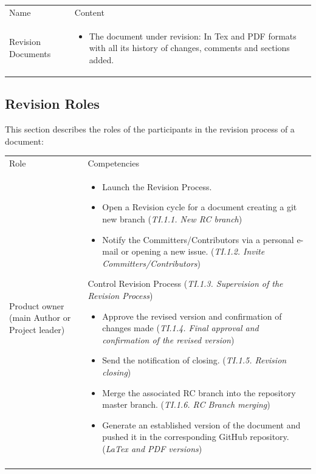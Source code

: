 \documentclass{template/openetcs_article}
\begin{document}
\begin{flushleft}
\begin{tabular}{|m{3cm}|m{11cm}|}
\hline
\rowcolor{myblue}
\multicolumn{2}{|c|}{Structure of the repository} \\\hline
\rowcolor{lightgray}
Name &
Content 
\\\hline
Revision Documents &
\begin{itemize}
\item The document under revision: In Tex and PDF formats with all its history of changes, comments and sections added.
\end{itemize}\\\hline
\end{tabular}
\end{flushleft}

\subsection{Revision Roles}

This section describes the roles of the participants in the revision process of a document:

\begin{flushleft}
\begin{tabular}{|m{3cm}|m{11cm}|}
\hline
\rowcolor{myblue}
\multicolumn{2}{|c|}{Roles} \\\hline
\rowcolor{lightgray}
Role &
Competencies \\\hline
Product owner (main Author or Project leader) &
\begin{itemize}
\item Launch the Revision Process.
\item Open a Revision cycle for a document creating a git new branch ({\it TI.1.1. New RC branch}) 
\item Notify the Committers/Contributors via a personal e-mail or opening a new issue.  ({\it TI.1.2. Invite Committers/Contributors})
\end{itemize}
\item Control Revision Process ({\it TI.1.3. Supervision of the Revision Process})
\begin{itemize}
\item Approve the revised version and confirmation of changes made ({\it TI.1.4. Final approval and confirmation of the revised version})
\item Send the notification of closing. ({\it TI.1.5. Revision closing})
\item Merge the associated RC branch into the repository master branch. ({\it TI.1.6. RC Branch merging})
\item Generate an established version of the document and pushed it in the corresponding GitHub repository. ({\it LaTex and PDF versions})
\end{itemize}
\\\\\hline
\end{tabular}
\end{flushleft}
\end{document}
